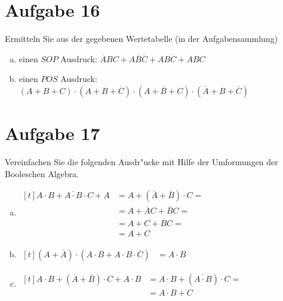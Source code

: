 \documentclass[10pt, oneside]{article}
\begin{document}
\section{Aufgabe 16}

Ermitteln Sie aus der gegebenen Wertetabelle (in der Aufgabensammlung)

\begin{enumerate}[(a)]
    \item einen $SOP$ Ausdruck:
        $\overline{A}BC + A\overline{B}\overline{C} + AB\overline{C} + ABC$
    \item einen $POS$ Ausdruck:
        $(A + B + C) \cdot (A + B + \overline{C}) \cdot (A + \overline{B} + C) \cdot (\overline{A} + B + \overline{C})$
\end{enumerate}

\section{Aufgabe 17}

Vereinfachen Sie die folgenden Ausdr"ucke mit Hilfe der Umformungen der
Booleschen Algebra.
\begin{enumerate}[(a)]
    \item $\begin{aligned}[t]
            A \cdot B + \overline{A \cdot B} \cdot C + A &= A + (\overline{A} + \overline{B}) \cdot C = \\
                                                         &= A + \overline{A}C + \overline{B}C = \\
                                                         &= A + C + \overline{B}C = \\
                                                         &= A + C
    \end{aligned}$
    \item $\begin{aligned}[t]
            (A + \overline{A}) \cdot (A \cdot B + A \cdot B \cdot \overline{C}) &= A \cdot B
    \end{aligned}$
    \item $\begin{aligned}[t]
            A \cdot B + (\overline{A} + \overline{B}) \cdot C + A \cdot B &= A \cdot B + (\overline{A \cdot B}) \cdot C = \\
                                                                          &= A \cdot B + C
    \end{aligned}$
\end{enumerate}
\end{document}
